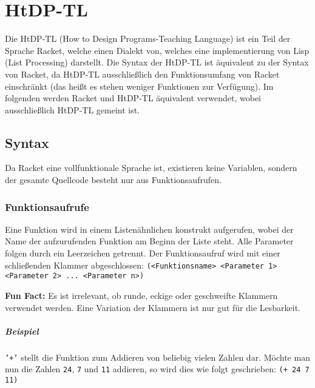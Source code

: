 


\chapter{HtDP-TL}
    Die HtDP-TL (How to Design Programs-Teaching Language) ist ein Teil der Sprache Racket, welche einen Dialekt von, welches eine implementierung von Lisp (List Processing) darstellt. Die Syntax der HtDP-TL ist äquivalent zu der Syntax von Racket, da HtDP-TL ausschließlich den Funktionsumfang von Racket einschränkt (das heißt es stehen weniger Funktionen zur Verfügung). Im folgenden werden Racket und HtDP-TL äquivalent verwendet, wobei ausschließlich HtDP-TL gemeint ist.

    \section{Syntax}
        Da Racket eine vollfunktionale Sprache ist, existieren keine Variablen, sondern der gesamte Quellcode besteht nur aus Funktionsaufrufen.

        \subsection{Funktionsaufrufe}
            Eine Funktion wird in einem Listenähnlichen konstrukt aufgerufen, wobei der Name der aufzurufenden Funktion am Beginn der Liste steht. Alle Parameter folgen durch ein Leerzeichen getrennt. Der Funktionsaufruf wird mit einer schließenden Klammer abgeschlossen: \texttt{(<Funktionsname> <Parameter 1> <Parameter 2> ... <Parameter n>)}

            \textbf{Fun Fact:} Es ist irrelevant, ob runde, eckige oder geschweifte Klammern verwendet werden. Eine Variation der Klammern ist nur gut für die Lesbarkeit.

            \paragraph{Beispiel}
                \texttt{'+'} stellt die Funktion zum Addieren von beliebig vielen Zahlen dar. Möchte man nun die Zahlen \texttt{24}, \texttt{7} und \texttt{11} addieren, so wird dies wie folgt geschrieben: \texttt{(+ 24 7 11)}



